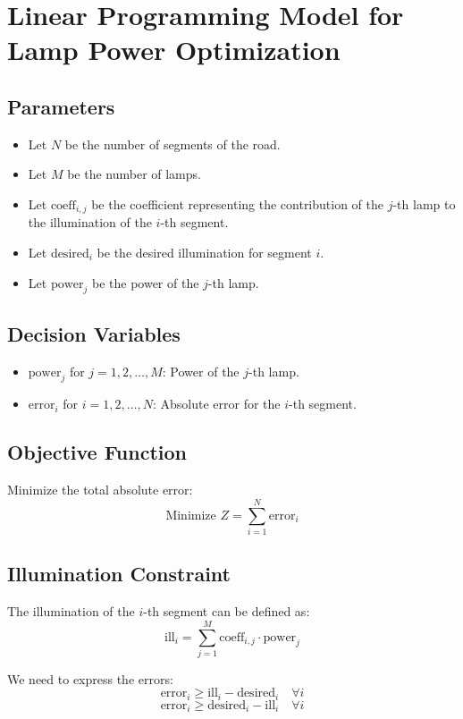 \documentclass{article}
\begin{document}
\section*{Linear Programming Model for Lamp Power Optimization}

\subsection*{Parameters}
\begin{itemize}
    \item Let \( N \) be the number of segments of the road.
    \item Let \( M \) be the number of lamps.
    \item Let \( \text{coeff}_{i,j} \) be the coefficient representing the contribution of the \( j \)-th lamp to the illumination of the \( i \)-th segment.
    \item Let \( \text{desired}_i \) be the desired illumination for segment \( i \).
    \item Let \( \text{power}_j \) be the power of the \( j \)-th lamp.
\end{itemize}

\subsection*{Decision Variables}
\begin{itemize}
    \item \( \text{power}_j \) for \( j = 1, 2, \ldots, M \): Power of the \( j \)-th lamp.
    \item \( \text{error}_i \) for \( i = 1, 2, \ldots, N \): Absolute error for the \( i \)-th segment.
\end{itemize}

\subsection*{Objective Function}
Minimize the total absolute error:
\[
\text{Minimize } Z = \sum_{i=1}^{N} \text{error}_i
\]

\subsection*{Illumination Constraint}
The illumination of the \( i \)-th segment can be defined as:
\[
\text{ill}_i = \sum_{j=1}^{M} \text{coeff}_{i,j} \cdot \text{power}_j
\]

We need to express the errors:
\[
\text{error}_i \geq \text{ill}_i - \text{desired}_i \quad \forall i
\]
\[
\text{error}_i \geq \text{desired}_i - \text{ill}_i \quad \forall i
\]
\end{document}
